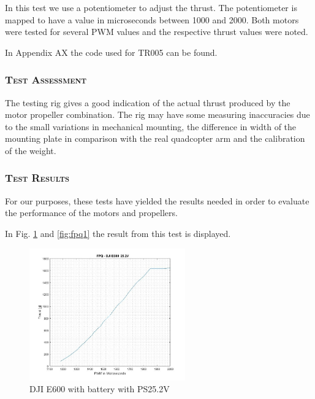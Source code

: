 In this test we use a potentiometer to adjust the thrust. The potentiometer is mapped to have a value in microseconds between 1000 and 2000. Both motors were tested for several PWM values and the respective thrust values were noted.

In Appendix AX the code used for TR005 can be found. 

\subsubsection*{\textsc{\medium Test Assessment}}
The testing rig gives a good indication of the actual thrust produced by the motor propeller combination. The rig may have some measuring inaccuracies due to the small variations in mechanical mounting, the difference in width of the mounting plate in comparison with the real quadcopter arm and the calibration of the weight.

\subsubsection*{\textsc{\medium Test Results}}
 For our purposes, these tests have yielded the results needed in order to evaluate the performance of the motors and propellers.
                 
In Fig. \ref{fig:fpq3} and \ref{fig:fpq1} the result from this test is displayed. 

\begin{figure}[H]
    \centering
    \includegraphics[width = 0.6\textwidth]{VAPIQ-PICTURES/FPQ3}
    \caption{DJI E600 with battery with PS25.2V}
    \label{fig:fpq3}
\end{figure}

